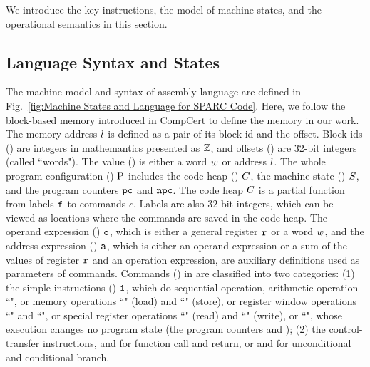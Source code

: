 We introduce the key \sparc{} instructions, the model of machine
states, and the operational semantics in this section.

\subsection{Language Syntax and States}
\label{subsec:syntax}

The machine model and syntax of \sparc{} assembly language
are defined in Fig.~\ref{fig:Machine States and Language for SPARC Code}.
Here, we follow the block-based memory \cite{CompCertMM} introduced
in CompCert to define the memory in our work.
The memory address $l$ is defined as a pair of
its block id and the offset. Block ids
() are integers
in mathemantics presented as $\mathbb{Z}$, 
and offsets ()
are 32-bit integers (called ``words").
The value ()
is either a word $w$ or address $l$.
The whole program configuration ()
$\text{P}$ includes the code heap ()
$C$, the machine state () $S$, 
and the program counters $\texttt{pc}$ and $\texttt{npc}$.
The code heap $C$ is a partial function
from labels $\texttt{f}_{}$ to commands $c$.
Labels are also 32-bit integers,
which can be viewed as locations
where the commands are saved in the code heap.
The operand expression ()
$\texttt{o}$, which is either a general
register $\texttt{r}_{}$ or a word $w$,
and the address expression () $\texttt{a}$,
which is either an operand expression or a
sum of the values of register $\texttt{r}_{}$ and an operation
expression, are auxiliary definitions used as parameters of commands.
Commands () in \sparc{} are classified into two categories:
(1) the simple instructions ()
$\texttt{i}{}$, which do sequential
operation, \eg{} arithmetic operation ``\cadd{}",
or memory operations
``\ld{}" (load) and ``\st{}" (store), or register window
operations ``\csave{}" and ``\crestore{}", or special
register operations ``\rd{}" (read) and ``\cwr{}" (write), 
or ``\nop{}", whose execution changes no program state
(the program counters \pc{} and \npc{});
(2) the control-transfer instructions,
\eg{} \call{} and \retl{} for
function call and return, or \jmp{} and \be{} for
unconditional and conditional branch.


